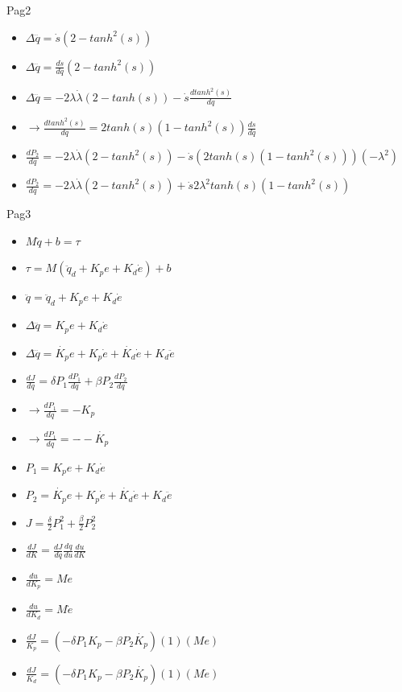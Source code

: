 \documentclass[10pt]{beamer}
\begin{document}
\begin{frame}[fragile]{Pag2}

\begin{itemize}
    \item $ \Delta \dddot{q} = \dot{s} (2 - tanh^2(s)) $
    \item $ \Delta \dddot{q} = \frac{d\dot{s}}{dq} (2 - tanh^2(s))$
    \item $ \Delta \dddot{q} = - 2 \lambda \dot{\lambda}(2 - tanh(s)) - \dot{s} \frac{d tanh^2(s)}{dq} $
    \item $ \rightarrow \frac{d tanh^2(s)}{dq} = 2 tanh(s) (1 - tanh^2(s) ) \frac{ds}{dq}  $
    \item $ \frac{dP_2}{dq} = -2 \lambda \dot{\lambda} (2 - tanh^2(s) )  - \dot{s} (2 tanh(s) (1 - tanh^2(s) ))( - \lambda^2) $
    \item $ \frac{dP_2}{dq} = -2 \lambda \dot{\lambda} (2 - tanh^2(s) )  + \dot{s} 2 \lambda^2 tanh(s)(1-tanh^2(s))$
\end{itemize}

\end{frame}

\begin{frame}[fragile]{Pag3}

\begin{itemize}
    \item $ M \ddot{q} + b = \tau $
    \item $ \tau = M ( \ddot{q}_d + K_p e + K_d \dot{e}) + b $
    \item $ \ddot{q } = \ddot{q}_d  + K_p e + K_d \dot{e} $
    \item $ \Delta \dddot{q} = K_p e + K_d \dot{e} $
    \item $ \Delta \dddot{q} = \dot{K_p} e + K_p \dot{e} + \dot{K_d} \dot{e} + K_d \ddot{e} $
    \item $\frac{dJ}{dq} = \delta P_1 \frac{dP_1}{dq} + \beta P_2 \frac{dP_2}{dq} $
    \item $ \rightarrow \frac{dP_1}{dq} = -K_p $
    \item $ \rightarrow \frac{dP_1}{dq} = - \dot{} - \dot{ K_p} $
    \item $  P_1 = K_p e + K_d \dot{e}$
    \item $ P_2 = \dot{K_p} e + K_p \dot{e} + \dot{K_d} \dot{e} + K_d \ddot{e} $
    \item $J = \frac{\delta}{2} P_1^2 + \frac{\beta}{2} P_2^2 $
    \item $ \frac{dJ}{dK} = \frac{dJ}{dq} \frac{dq}{du} \frac{du}{dK} $
    \item $ \frac{du}{dK_p} = Me $
    \item $\frac{du}{dK_d} = M\dot{e} $
    \item $ \frac{dJ}{K_p} = (- \delta P_1 K_p - \beta P_2 \dot{K_p} ) (1) (Me) $
    \item $ \frac{dJ}{K_d} = (- \delta P_1 K_p - \beta P_2 \dot{K_p})(1)(M\dot{e}) $
\end{itemize}

\end{frame}
\end{document}
